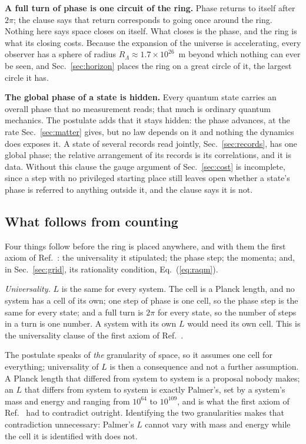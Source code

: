 \documentclass[aps,prd,twocolumn,superscriptaddress,nofootinbib]{revtex4-2}
\begin{document}
\textbf{A full turn of phase is one circuit of the ring.} Phase returns to itself after $2\pi$; the clause says that return corresponds to going once around the ring. Nothing here says space closes on itself. What closes is the phase, and the ring is what its closing costs. Because the expansion of the universe is accelerating, every observer has a sphere of radius $R_\Lambda\approx1.7\times10^{26}$~m beyond which nothing can ever be seen, and Sec.~\ref{sec:horizon} places the ring on a great circle of it, the largest circle it has.

\textbf{The global phase of a state is hidden.} Every quantum state carries an overall phase that no measurement reads; that much is ordinary quantum mechanics. The postulate adds that it stays hidden: the phase advances, at the rate Sec.~\ref{sec:matter} gives, but no law depends on it and nothing the dynamics does exposes it. A state of several records read jointly, Sec.~\ref{sec:records}, has one global phase; the relative arrangement of its records is its correlations, and it is data. Without this clause the gauge argument of Sec.~\ref{sec:cost} is incomplete, since a step with no privileged starting place still leaves open whether a state's phase is referred to anything outside it, and the clause says it is not.

\subsection{What follows from counting}
\label{sec:counting}

Four things follow before the ring is placed anywhere, and with them the first axiom of Ref.~\cite{korytko2026}: the universality it stipulated; the phase step; the momenta; and, in Sec.~\ref{sec:grid}, its rationality condition, Eq.~(\ref{eq:raqm}).

\emph{Universality.} $L$ is the same for every system. The cell is a Planck length, and no system has a cell of its own; one step of phase is one cell, so the phase step is the same for every state; and a full turn is $2\pi$ for every state, so the number of steps in a turn is one number. A system with its own $L$ would need its own cell. This is the universality clause of the first axiom of Ref.~\cite{korytko2026}.

The postulate speaks of \emph{the} granularity of space, so it assumes one cell for everything; universality of $L$ is then a consequence and not a further assumption. A Planck length that differed from system to system is a proposal nobody makes; an $L$ that differs from system to system is exactly Palmer's, set by a system's mass and energy and ranging from $10^{64}$ to $10^{109}$, and is what the first axiom of Ref.~\cite{korytko2026} had to contradict outright. Identifying the two granularities makes that contradiction unnecessary: Palmer's $L$ cannot vary with mass and energy while the cell it is identified with does not.
\end{document}
